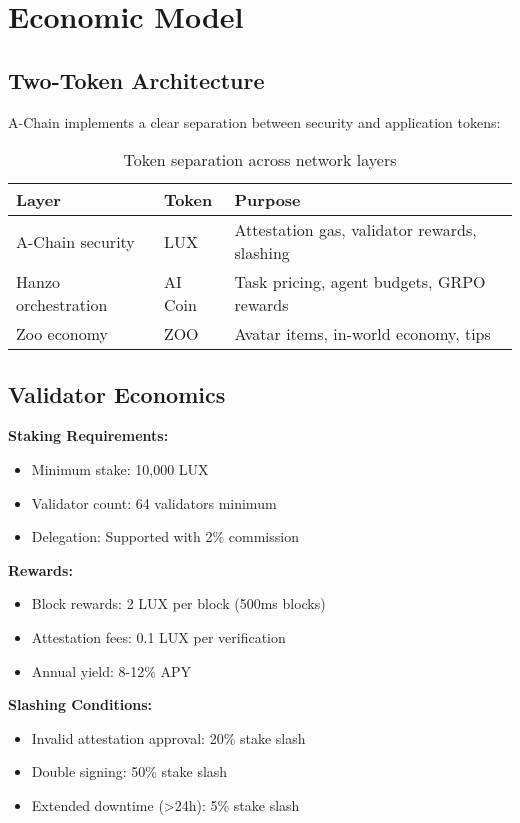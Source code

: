 \documentclass[11pt,a4paper]{article}
\begin{document}
\section{Economic Model}

\subsection{Two-Token Architecture}

A-Chain implements a clear separation between security and application tokens:

\begin{table}[h]
\centering
\begin{tabular}{@{}lll@{}}
\toprule
\textbf{Layer} & \textbf{Token} & \textbf{Purpose} \\ \midrule
A-Chain security & LUX & Attestation gas, validator rewards, slashing \\
Hanzo orchestration & AI Coin & Task pricing, agent budgets, GRPO rewards \\
Zoo economy & ZOO & Avatar items, in-world economy, tips \\ \bottomrule
\end{tabular}
\caption{Token separation across network layers}
\end{table}

\subsection{Validator Economics}

\textbf{Staking Requirements:}
\begin{itemize}
\item Minimum stake: 10,000 LUX
\item Validator count: 64 validators minimum
\item Delegation: Supported with 2\% commission
\end{itemize}

\textbf{Rewards:}
\begin{itemize}
\item Block rewards: 2 LUX per block (500ms blocks)
\item Attestation fees: 0.1 LUX per verification
\item Annual yield: 8-12\% APY
\end{itemize}

\textbf{Slashing Conditions:}
\begin{itemize}
\item Invalid attestation approval: 20\% stake slash
\item Double signing: 50\% stake slash
\item Extended downtime (>24h): 5\% stake slash
\end{itemize}
\end{document}
